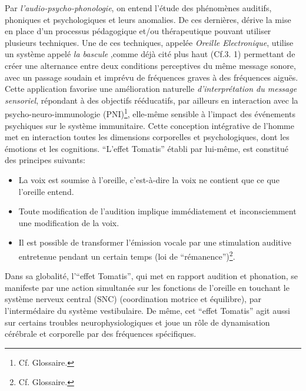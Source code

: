 Par {\textit{l'audio-psycho-phonologie}}, on entend l'étude des
phénomènes auditifs, phoniques et psychologiques et leurs anomalies.
De ces dernières,  dérive la mise en place d'un processus pédagogique
et/ou thérapeutique pouvant
utiliser plusieurs techniques.
Une de ces techniques,
  appelée
\label{outil_oreille_electro}
\textit{Oreille Electronique}, utilise
un système appelé \textit{ la
bascule} \autocite{escera-key},comme déjà cité plus haut (Cf.3. 1) permettant de créer une alternance entre deux conditions perceptives
du même message sonore, avec un passage soudain et imprévu de fréquences graves à des
fréquences aiguës.
Cette application favorise une amélioration naturelle \emph{d'interprétation du message
sensoriel}, répondant à des objectifs rééducatifs, par ailleurs en
interaction avec la psycho-neuro-immunologie (\gls{PNI})\footnote{Cf. Glossaire.}, elle-même sensible à
l'impact des événements psychiques sur le système immunitaire.
Cette conception intégrative de l'homme met en interaction toutes les
dimensions corporelles et psychologiques, dont les émotions et les cognitions.
``L'effet Tomatis'' établi par lui-même, est constitué des principes suivants:
\begin{itemize}
	\item La voix est soumise à l'oreille, c'est-à-dire la voix ne contient que ce que l'oreille entend.
	\item Toute modification de l'audition implique immédiatement
          et inconsciemment une
          modification de la voix.
	\item Il est possible de transformer l'émission vocale par une stimulation
auditive
		entretenue pendant un certain temps (loi de
               ``\gls{rémanence}'')\footnote{Cf. Glossaire.}.

\end{itemize}
Dans sa globalité, l'``effet Tomatis'', qui met en rapport audition et phonation, se manifeste par une 
action
simultanée sur les fonctions de
l'oreille en touchant le système nerveux central (SNC) (coordination
                motrice et équilibre), par l'intermédaire du système
                vestibulaire.
                De même, cet ``effet Tomatis'' agit aussi sur certains troubles
                neurophysiologiques et  joue un rôle de dynamisation cérébrale et corporelle
                par des fréquences spécifiques.


